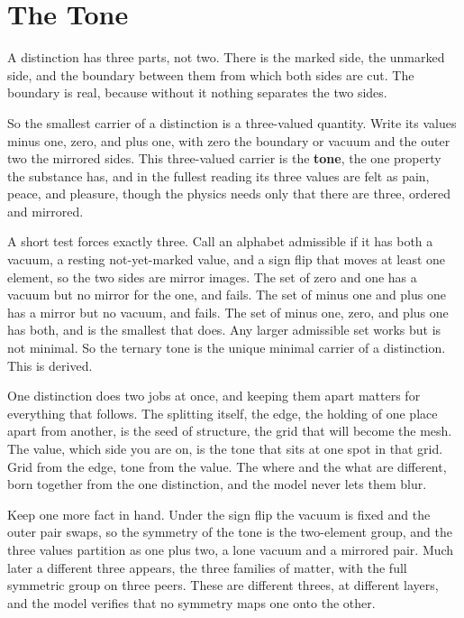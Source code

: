 \section{The Tone}

A distinction has three parts, not two. There is the marked side, the unmarked side, and the boundary between them from which both sides are cut. The boundary is real, because without it nothing separates the two sides.

So the smallest carrier of a distinction is a three-valued quantity. Write its values minus one, zero, and plus one, with zero the boundary or vacuum and the outer two the mirrored sides. This three-valued carrier is the \textbf{tone}, the one property the substance has, and in the fullest reading its three values are felt as pain, peace, and pleasure, though the physics needs only that there are three, ordered and mirrored.

A short test forces exactly three. Call an alphabet admissible if it has both a vacuum, a resting not-yet-marked value, and a sign flip that moves at least one element, so the two sides are mirror images. The set of zero and one has a vacuum but no mirror for the one, and fails. The set of minus one and plus one has a mirror but no vacuum, and fails. The set of minus one, zero, and plus one has both, and is the smallest that does. Any larger admissible set works but is not minimal. So the ternary tone is the unique minimal carrier of a distinction. This is derived.

One distinction does two jobs at once, and keeping them apart matters for everything that follows. The splitting itself, the edge, the holding of one place apart from another, is the seed of structure, the grid that will become the mesh. The value, which side you are on, is the tone that sits at one spot in that grid. Grid from the edge, tone from the value. The where and the what are different, born together from the one distinction, and the model never lets them blur.

Keep one more fact in hand. Under the sign flip the vacuum is fixed and the outer pair swaps, so the symmetry of the tone is the two-element group, and the three values partition as one plus two, a lone vacuum and a mirrored pair. Much later a different three appears, the three families of matter, with the full symmetric group on three peers. These are different threes, at different layers, and the model verifies that no symmetry maps one onto the other.
